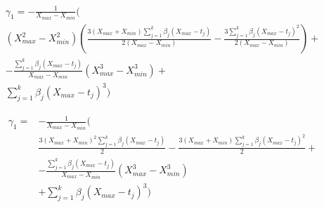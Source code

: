 \documentclass{article}
\begin{document}
\begin{multline*}
\gamma_1  = -\frac{1}{X_{max}-X_{min}} \Biggl( \\ 
(X^2_{max}-X^2_{min}) \left(\frac{3(X_{max}+X_{min}) \sum_{j=1}^k\beta_j (X_{max}-t_j) }{2 (X_{max}-X_{min})} 
-\frac{3  \sum_{j=1}^k\beta_j (X_{max}-t_j)^2  }{2 (X_{max}-X_{min})} \right) + \\
-\frac{\sum_{j=1}^k\beta_j (X_{max}-t_j)}{X_{max}-X_{min}} (X_{max}^3-X^3_{min}) + \\ \sum_{j=1}^k\beta_j (X_{max}-t_j)^3 \Biggr)
\end{multline*}

%


\begin{equation*}
\begin{aligned}
 \gamma_1  = &    -\frac{1}{X_{max}-X_{min}} \Biggl( \\
&   \frac{3(X_{max}+X_{min})^2 \sum_{j=1}^k\beta_j (X_{max}-t_j) }{2} 
-\frac{3(X_{max}+X_{min})  \sum_{j=1}^k\beta_j (X_{max}-t_j)^2  }{2}  + \\
& -\frac{\sum_{j=1}^k\beta_j (X_{max}-t_j)}{X_{max}-X_{min}} (X_{max}^3-X^3_{min})\\
& + \sum_{j=1}^k\beta_j (X_{max}-t_j)^3\Biggr)\\
\end{aligned}
\end{equation*}
\end{document}
